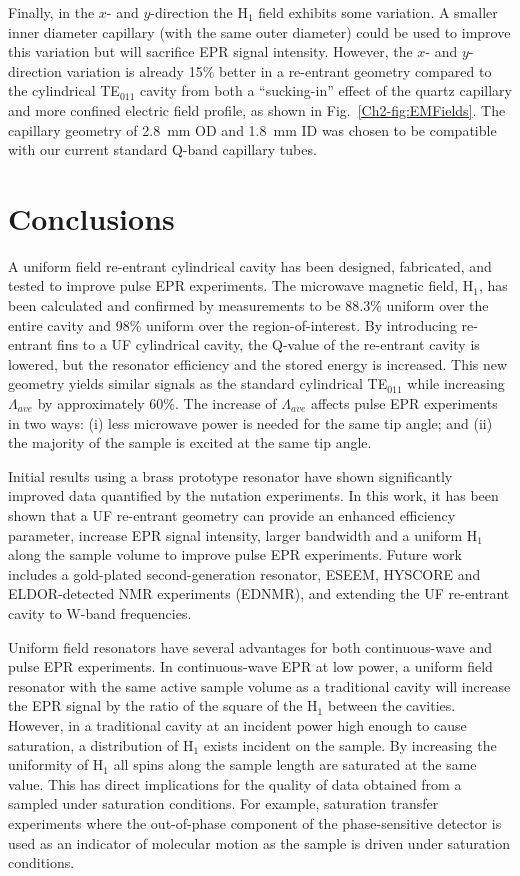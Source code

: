 Finally, in the $x$- and $y$-direction the H$_1$ field exhibits some variation. A smaller inner diameter capillary (with the same outer diameter) could be used to improve this variation but will sacrifice EPR signal intensity. However, the $x$- and $y$-direction variation is already 15\% better in a re-entrant geometry compared to the cylindrical TE$_{011}$ cavity from both a ``sucking-in'' effect of the quartz capillary and more confined electric field profile, as shown in Fig.~\ref{Ch2-fig:EMFields}. The capillary geometry of 2.8~mm OD and 1.8~mm ID was chosen to be compatible with our current standard Q-band capillary tubes. 

\section{Conclusions}
A uniform field re-entrant cylindrical \cylTE{} cavity has been designed, fabricated, and tested to improve pulse EPR experiments. The microwave magnetic field, H$_1$, has been calculated and confirmed by measurements to be 88.3\% uniform over the entire cavity and 98\% uniform over the region-of-interest. By introducing re-entrant fins to a UF cylindrical \cylTE{} cavity, the Q-value of the re-entrant \cylTE{} cavity is lowered, but the resonator efficiency and the stored energy is increased. This new geometry yields similar signals as the standard cylindrical TE$_{011}$ while increasing $\Lambda_{ave}$ by approximately 60\%. The increase of $\Lambda_{ave}$ affects pulse EPR experiments in two ways: (i) less microwave power is needed for the same tip angle; and (ii) the majority of the sample is excited at the same tip angle. 

Initial results using a brass prototype resonator have shown significantly improved data quantified by the nutation experiments. In this work, it has been shown that a UF re-entrant geometry can provide an enhanced efficiency parameter, increase EPR signal intensity, larger bandwidth and a uniform H$_1$ along the sample volume to improve pulse EPR experiments. Future work includes a gold-plated second-generation resonator, ESEEM, HYSCORE and ELDOR-detected NMR experiments (EDNMR), and extending the UF re-entrant \cylTE{} cavity to W-band frequencies.

Uniform field resonators have several advantages for both continuous-wave and pulse EPR experiments. In continuous-wave EPR at low power, a uniform field resonator with the same active sample volume as a traditional cavity will increase the EPR signal by the ratio of the square of the H$_1$ between the cavities. However, in a traditional cavity at an incident power high enough to cause saturation, a distribution of H$_1$ exists incident on the sample. By increasing the uniformity of H$_1$ all spins along the sample length are saturated at the same value. This has direct implications for the quality of data obtained from a sampled under saturation conditions. For example, saturation transfer experiments where the out-of-phase component of the phase-sensitive detector is used as an indicator of molecular motion as the sample is driven under saturation conditions. \cite{SaturationTransfer2005} 

